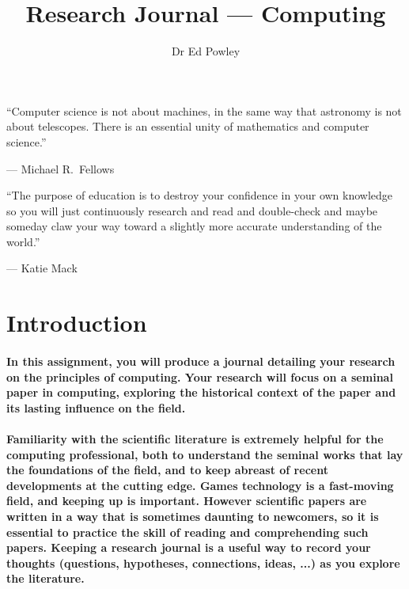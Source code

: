\documentclass{../../fal_assignment}
\title{Research Journal --- Computing}
\author{Dr Ed Powley}
\begin{document}
\maketitle

\begin{marginquote}
  ``Computer science is not about machines, in the same way that astronomy is not about telescopes. There is an essential unity of mathematics and computer science.''
    
    --- Michael R.\ Fellows
    
    \marginquoterule
    
    ``The purpose of education is to destroy your confidence in your own knowledge so you will just continuously research and read and double-check and maybe someday claw your way toward a slightly more accurate understanding of the world.''
    
    --- Katie Mack
\end{marginquote}

\section*{Introduction}

\paragraph{
In this assignment, you will produce a journal detailing your research on the principles of computing.
Your research will focus on a seminal paper in computing,
exploring the historical context of the paper and its lasting influence on the field.
}

\paragraph{
Familiarity with the scientific literature is extremely helpful for the computing professional,
both to understand the seminal works that lay the foundations of the field,
and to keep abreast of recent developments at the cutting edge.
Games technology is a fast-moving field, and keeping up is important.
However scientific papers are written in a way that is sometimes daunting to newcomers,
so it is essential to practice the skill of reading and comprehending such papers.
Keeping a research journal is a useful way to record your thoughts
(questions, hypotheses, connections, ideas, ...) as you explore the literature.
}
\end{document}
